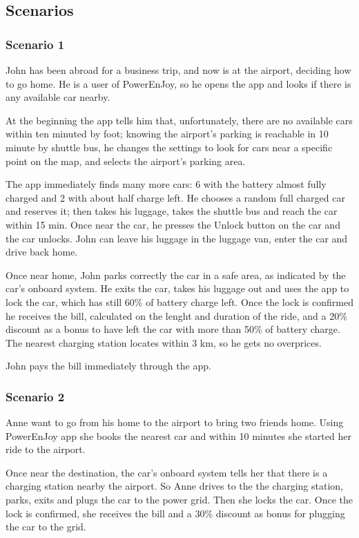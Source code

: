 \documentclass[11pt]{article} %
\newcommand{\pe}{PowerEnJoy }
\newcommand{\pecomma}{PowerEnJoy, }
\begin{document}
\subsection{Scenarios}

\subsubsection{Scenario 1}
John has been abroad for a business trip, and now is at the airport, deciding how to go home. He is a user of \pecomma so  he opens the app and looks if there is any available car nearby. 

At the beginning the app tells him that, unfortunately, there are no available cars within ten minuted by foot; knowing the airport's parking is reachable in 10 minute by shuttle bus, he changes the settings to look for cars near a specific point on the map, and selects the airport's parking area. 

The app immediately finds many more cars: 6 with the battery almost fully charged and 2 with about half charge left. He chooses a random full charged car and reserves it; then takes his luggage, takes the shuttle bus and reach the car within 15 min. Once near the car, he presses the Unlock button on the car and the car unlocks. John can leave his luggage in the luggage van, enter the car and drive back home.

Once near home, John parks correctly the car in a safe area, as indicated by the car's onboard system. He exits the car, takes his luggage out and uses the app to lock the car, which has still 60\% of battery charge left. Once the lock is confirmed he receives the bill, calculated on the lenght and duration of the ride, and a 20\% discount as a bonus to have left the car with more than 50\% of battery charge. The nearest charging station locates within 3 km, so he gets no overprices.

John pays the bill immediately through the app.

\subsubsection{Scenario 2}
Anne want to go from his home to the airport to bring two friends home. Using \pe app she books the nearest car and within 10 minutes she started her ride to the airport.

Once near the destination, the car's onboard system tells her that there is a charging station nearby the airport. So Anne drives to the the charging station, parks, exits and plugs the car to the power grid. Then she locks the car. Once the lock is confirmed, she receives the bill and a 30\% discount as bonus for plugging the car to the grid.
\end{document}
